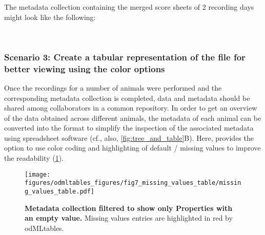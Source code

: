 The metadata collection containing the merged score sheets of 2 recording days might look like the following:

\begin{minipage}[t]{\textwidth}
\ \\
\end{minipage}

\subsubsection*{Scenario 3: Create a tabular representation of the  file for better viewing using the color options}
Once the recordings for a number of animals were performed and the corresponding metadata collection is completed, data and metadata should be shared among collaborators in a common repository. In order to get an overview of the data obtained across different animals, the metadata of each animal can be converted into the  format to simplify the inspection of the associated metadata using spreadsheet software (cf., also, \cref{fig:tree_and_table}B). Here,  provides the option to use color coding and highlighting of default / missing values to improve the readability (\cref{fig:missing_values_table}).

\begin{figure}[hbt]
\begin{center}
\texttt{[image: figures/odmltables\_figures/fig7\_missing\_values\_table/missing\_values\_table.pdf]}
\caption[Metadata collection filtered to show only Properties with an empty value]{\label{fig:missing_values_table}
\textbf{Metadata collection filtered to show only Properties with an empty value.} Missing values entries are highlighted in red by odMLtables.}
\end{center}
\end{figure}

